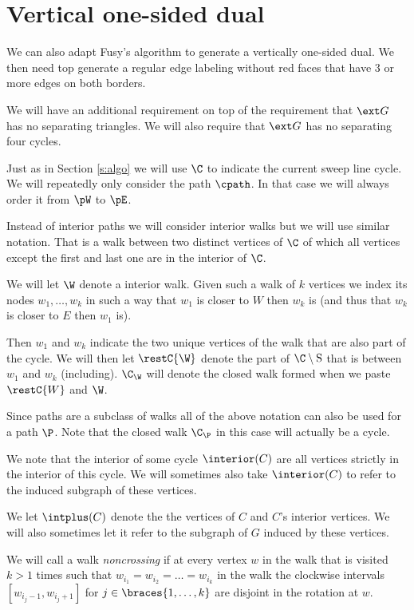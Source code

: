 

\section{Vertical one-sided dual}
\label{s:red}

We can also adapt Fusy's algorithm to generate a vertically one-sided dual. We then need top generate a regular edge labeling without red faces that have $3$ or more edges on both borders.

We will have an additional requirement on top of the requirement that $\ext G$ has no separating triangles. We will also require that $\ext G$ has no separating four cycles.


  Just as in Section \ref{s:algo} we will use $\C$ to indicate the current sweep line cycle.
  We will repeatedly only consider the path $\cpath$. In that case we will always order it from $\pW$ to $\pE$.

  Instead of interior paths we will consider interior walks but we will use similar notation. That is a walk between two distinct vertices of $\C$ of which all vertices except the first and last one are in the interior of $\C$.

  We will let $\W$ denote a interior walk. Given such a walk of $k$ vertices we index its nodes $w_1, \ldots, w_k$  in such a way that $w_1$ is closer to $W$ then $w_k$ is (and thus that $w_k$ is closer to $E$ then $w_1$ is).

  Then $w_1$ and $w_k$ indicate the two unique vertices of the walk that are also part of the cycle. We will then let $\restC{\W}$ denote the part of $\C\setminus {\mathrm{S}}$ that is between $w_1$ and $w_k$ (including). $\C_\W$ will denote the closed walk formed when we paste $\restC{W}$ and $\W$.

  Since paths are a subclass of walks all of the above notation can also be used for a path $\P$. Note that the closed walk $\C_\P$ in this case will actually be a cycle.


  We note that the interior of some cycle $\interior(C)$ are all vertices strictly in the interior of this cycle. We will sometimes also take $\interior(C)$ to refer to the induced subgraph of these vertices.

  We let $\intplus(C)$ denote the the vertices of $C$ and $C$'s interior vertices. We will also sometimes let it refer to the subgraph of $G$ induced by these vertices.

  We will call a walk \emph{noncrossing} if at every vertex $w$ in the walk that is visited $k >1$ times such that $w_{i_1} = w_{i_2} = \ldots = w_{i_k}$ in the walk the clockwise intervals $[w_{i_j-1}, w_{i_j+1}]$ for $j \in \braces {1, \ldots, k}$ are disjoint in the rotation at $w$.


